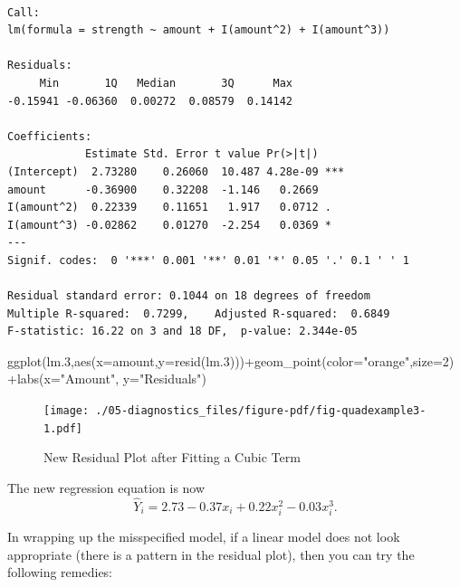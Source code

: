 \documentclass[
  letterpaper,
  DIV=11,
  numbers=noendperiod]{scrreprt}
\newenvironment{Shaded}{\begin{snugshade}}{\end{snugshade}}
\newcommand{\AttributeTok}[1]{\textcolor[rgb]{0.40,0.45,0.13}{#1}}
\newcommand{\DecValTok}[1]{\textcolor[rgb]{0.68,0.00,0.00}{#1}}
\newcommand{\FloatTok}[1]{\textcolor[rgb]{0.68,0.00,0.00}{#1}}
\newcommand{\FunctionTok}[1]{\textcolor[rgb]{0.28,0.35,0.67}{#1}}
\newcommand{\NormalTok}[1]{\textcolor[rgb]{0.00,0.23,0.31}{#1}}
\newcommand{\SpecialCharTok}[1]{\textcolor[rgb]{0.37,0.37,0.37}{#1}}
\newcommand{\StringTok}[1]{\textcolor[rgb]{0.13,0.47,0.30}{#1}}
\begin{document}
\begin{verbatim}

Call:
lm(formula = strength ~ amount + I(amount^2) + I(amount^3))

Residuals:
     Min       1Q   Median       3Q      Max 
-0.15941 -0.06360  0.00272  0.08579  0.14142 

Coefficients:
            Estimate Std. Error t value Pr(>|t|)    
(Intercept)  2.73280    0.26060  10.487 4.28e-09 ***
amount      -0.36900    0.32208  -1.146   0.2669    
I(amount^2)  0.22339    0.11651   1.917   0.0712 .  
I(amount^3) -0.02862    0.01270  -2.254   0.0369 *  
---
Signif. codes:  0 '***' 0.001 '**' 0.01 '*' 0.05 '.' 0.1 ' ' 1

Residual standard error: 0.1044 on 18 degrees of freedom
Multiple R-squared:  0.7299,    Adjusted R-squared:  0.6849 
F-statistic: 16.22 on 3 and 18 DF,  p-value: 2.344e-05
\end{verbatim}

\begin{Shaded}
\begin{Highlighting}[]
\FunctionTok{ggplot}\NormalTok{(lm}\FloatTok{.3}\NormalTok{,}\FunctionTok{aes}\NormalTok{(}\AttributeTok{x=}\NormalTok{amount,}\AttributeTok{y=}\FunctionTok{resid}\NormalTok{(lm}\FloatTok{.3}\NormalTok{)))}\SpecialCharTok{+}\FunctionTok{geom\_point}\NormalTok{(}\AttributeTok{color=}\StringTok{"orange"}\NormalTok{,}\AttributeTok{size=}\DecValTok{2}\NormalTok{)}\SpecialCharTok{+}\FunctionTok{labs}\NormalTok{(}\AttributeTok{x=}\StringTok{"Amount"}\NormalTok{, }\AttributeTok{y=}\StringTok{"Residuals"}\NormalTok{)}
\end{Highlighting}
\end{Shaded}

\begin{figure}[H]

{\centering \texttt{[image: ./05-diagnostics\_files/figure-pdf/fig-quadexample3-1.pdf]}

}

\caption{\label{fig-quadexample3}New Residual Plot after Fitting a Cubic
Term}

\end{figure}

The new regression equation is now
\[\hat{Y}_{i} = 2.73 - 0.37x_{i}+0.22x^{2}_{i}-0.03x^{3}_{i}.\]

In wrapping up the misspecified model, if a linear model does not look
appropriate (there is a pattern in the residual plot), then you can try
the following remedies:
\end{document}
